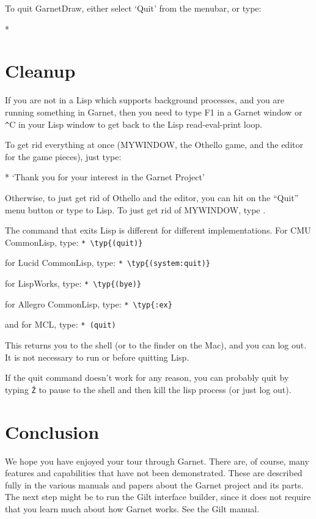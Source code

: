 To quit GarnetDraw, either select `Quit' from the menubar, or type:

\begin{programexample}
* 
\end{programexample}



\chapter{Cleanup}
\label{quitting}

If you are not in a Lisp which supports background processes, and
you are running something in Garnet, then you need to type F1 in a
Garnet window or {\texttt \^}C in your Lisp window to get back to the Lisp
read-eval-print loop.

To get rid everything at once (MYWINDOW, the Othello game, and the
editor for the game pieces), just type:
\begin{programexample}
* 
`Thank you for your interest in the Garnet Project'
\end{programexample}

Otherwise,
to just get rid of Othello and the editor, you can hit on the ``Quit'' menu
button or type  to Lisp.  To just get rid of MYWINDOW,
type .

The command that exits Lisp is different for different implementations.
For CMU CommonLisp, type: \verb+* \typ{(quit)}+

for Lucid CommonLisp, type: \verb+* \typ{(system:quit)}+

for LispWorks, type: \verb+* \typ{(bye)}+

for Allegro CommonLisp, type: \verb+* \typ{:ex}+

and for MCL, type: \verb+* (quit)+

This returns you to the shell (or to the finder on the Mac), and you
can log out.  It is not necessary to run  or
 before quitting Lisp.

If the quit command doesn't work for any reason,
you can probably quit by typing \texttt{\^Z} to pause to the shell and
then kill the lisp process (or just log out).

\chapter{Conclusion}
We hope you have enjoyed your tour through Garnet.  There are, of course,
many features and capabilities that have not been demonstrated.  These are
described fully in the various manuals and papers about the Garnet project
and its parts.  The next step might be to run the Gilt interface
builder, since it does not require that you learn much about how
Garnet works.  See the Gilt manual.

